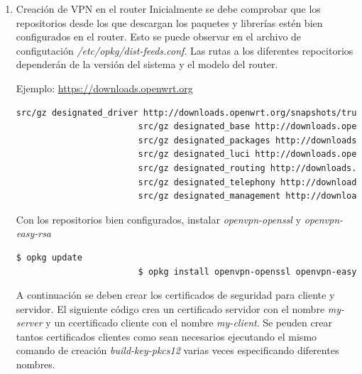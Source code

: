 \documentclass[12pt]{article}
\begin{document}
            \begin{enumerate}
                \item Creación de VPN en el router 
                    Inicialmente se debe comprobar que los repositorios desde los que descargan los paquetes y librerías estén bien configurados en el router. Esto se puede observar en el archivo de configutación \textit{/etc/opkg/dist-feeds.conf}. Las rutas a los diferentes repocitorios dependerán de la versión del sistema y el modelo del router.

                    Ejemplo:
                    \url{https://downloads.openwrt.org}

                    \begin{lstlisting}[language=bash]
                        src/gz designated_driver http://downloads.openwrt.org/snapshots/trunk/brcm63xx/smp/packages/packages
                        src/gz designated_base http://downloads.openwrt.org/snapshots/trunk/brcm63xx/smp/packages/base
                        src/gz designated_packages http://downloads.openwrt.org/snapshots/trunk/brcm63xx/smp/packages/packages
                        src/gz designated_luci http://downloads.openwrt.org/snapshots/trunk/brcm63xx/smp/packages/luci
                        src/gz designated_routing http://downloads.openwrt.org/snapshots/trunk/brcm63xx/smp/packages/routing
                        src/gz designated_telephony http://downloads.openwrt.org/snapshots/trunk/brcm63xx/smp/packages/telephony
                        src/gz designated_management http://downloads.openwrt.org/snapshots/trunk/brcm63xx/smp/packages/management
                    \end{lstlisting}
                    
                    Con los repositorios bien configurados, instalar \textit{openvpn-openssl} y \textit{openvpn-easy-rsa}
                    
                    \begin{lstlisting}[language=bash]
                        $ opkg update
                        $ opkg install openvpn-openssl openvpn-easy-rsa
                    \end{lstlisting}

                    A continuación se deben crear los certificados de seguridad para cliente y servidor. El siguiente código crea un certificado servidor con el nombre \textit{my-server} y un ccertificado cliente con el nombre \textit{my-client}. Se peuden crear tantos certificados clientes como sean necesarios ejecutando el mismo comando de creación \textit{build-key-pkcs12} varias veces especificando diferentes nombres.


\end{enumerate}
\end{document}
